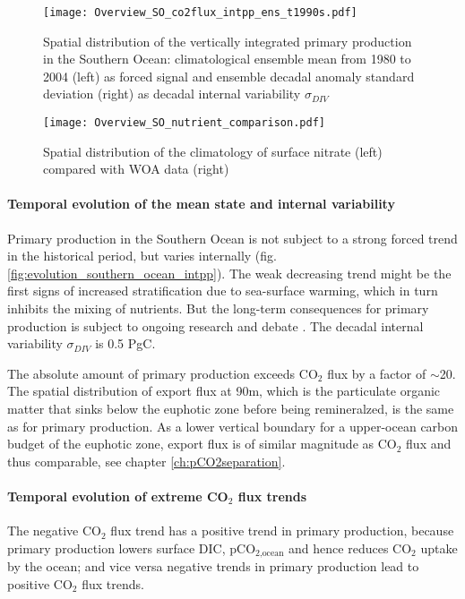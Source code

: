 \documentclass[12pt]{article}
\begin{document}
\begin{figure}[h!]
	\centering
	\texttt{[image: Overview\_SO\_co2flux\_intpp\_ens\_t1990s.pdf]} %
	\caption{Spatial distribution of the vertically integrated primary production in the Southern Ocean: climatological ensemble mean from 1980 to 2004 (left) as forced signal and ensemble decadal anomaly standard deviation (right) as decadal internal variability $\sigma_{DIV}$}
	\label{fig:SO_intpp_ensmean_ensstd}
\end{figure}

\begin{figure}[h!]
	\centering
	\texttt{[image: Overview\_SO\_nutrient\_comparison.pdf]} %
	\caption{Spatial distribution of the climatology of surface nitrate (left) compared with WOA data \citep{WOA2013} (right)}
	\label{fig:SO_comp_nitrate}
\end{figure}



\paragraph{Temporal evolution of the mean state and internal variability}
Primary production in the Southern Ocean is not subject to a strong forced trend in the historical period, but varies internally (fig. \ref{fig:evolution_southern_ocean_intpp}). The weak decreasing trend might be the first signs of increased stratification due to sea-surface warming, which in turn inhibits the mixing of nutrients. But the long-term consequences for primary production is subject to ongoing research and debate \citep{Bopp2013,Taucher2011,Lozier2011,Kessler2016,Krumhardt2017}. The decadal internal variability $\sigma_{DIV}$ is 0.5 PgC.

The absolute amount of primary production exceeds CO$_2$ flux by a factor of $\sim$20. The spatial distribution of export flux at 90m, which is the particulate organic matter that sinks below the euphotic zone before being remineralzed, is the same as for primary production. As a lower vertical boundary for a upper-ocean carbon budget of the euphotic zone, export flux is of similar magnitude as CO$_2$ flux and thus comparable, see chapter \ref{ch:pCO2separation}.

\paragraph{Temporal evolution of extreme CO$_2$ flux trends}
The negative CO$_2$ flux trend has a positive trend in primary production, because primary production lowers surface DIC, pCO$_{2\text{,ocean}}$ and hence reduces CO$_2$ uptake by the ocean; and vice versa negative trends in primary production lead to positive CO$_2$ flux trends.
\end{document}
